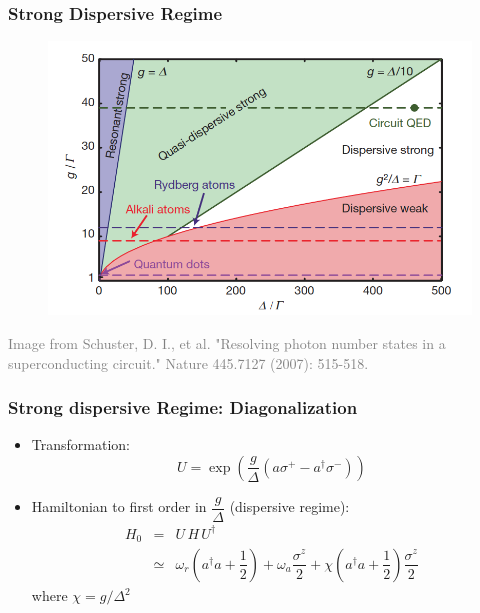 \documentclass[xcolor=dvipsnames,hyperref={CJKbookmarks=true}]{beamer}
\begin{document}
\begin{frame}
\frametitle{Strong Dispersive Regime}
\begin{figure}
\centering
\includegraphics[width=.9\textwidth]{Regime}
\end{figure}

\tiny{\textcolor{gray}{Image from Schuster, D. I., et al. "Resolving photon number states in a superconducting circuit." Nature 445.7127 (2007): 515-518.\cite{schuster2007resolving}}}
\end{frame}

\begin{frame}
\frametitle{Strong dispersive Regime: Diagonalization}
\begin{itemize}
\item Transformation: 
$$U=\exp{\left(\dfrac{g}{\Delta}\left(a\sigma^{+}-a^{\dagger}\sigma^{-} \right)\right)}$$
\item Hamiltonian to first order in $\dfrac{g}{\Delta}$ (dispersive regime):
\begin{eqnarray*}
H_0 &=& U\,H\,U^{\dagger}\\
&\simeq &  \omega_r \left(a^{\dagger} a+ \dfrac{1}{2} \right) +  \omega_a \dfrac{\sigma^{z}}{2}+ \chi \left(a^{\dagger}a+\dfrac{1}{2} \right)\dfrac{\sigma^{z}}{2}
\end{eqnarray*}
where $\chi = g/\Delta ^2$
\end{itemize}
\end{frame}
\end{document}
